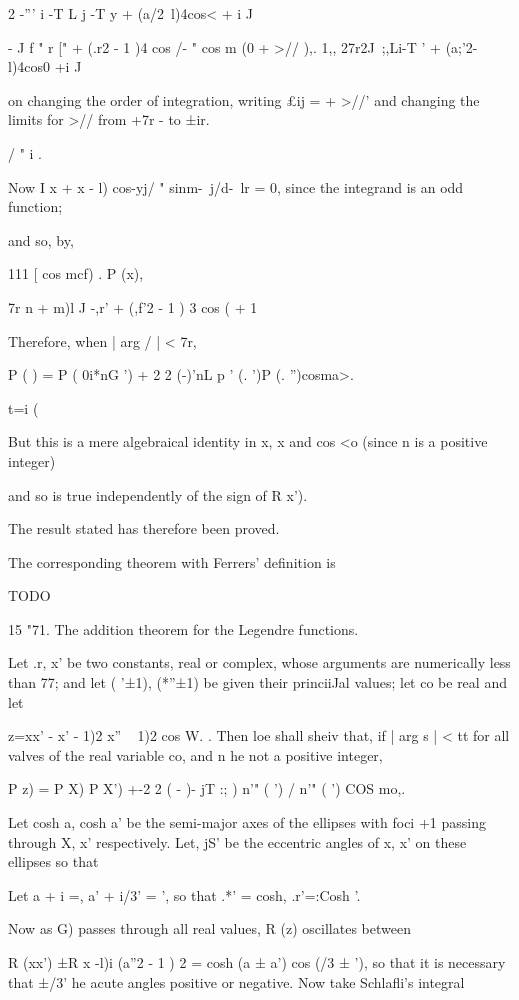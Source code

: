 {{{2 -''' i -T L j -T y + (a/2\ l)4cos< + i J

- J f " r [" + (.r2 - 1 )4 cos /- " cos m (0 + >// ),. 1,, 27r2J\
;,Li-T ' + (a;'2-l)4cos0 +i J

on changing the order of integration, writing £ij = + >//' and
changing the limits for >// from +7r - to ±ir.

%
%

/ " i .

Now I x + x - l) cos-yj/ " sinm-\ j/d-\ lr = 0, since the integrand is
an odd function;

and so, by,

111 [ cos mcf) . P (x),

7r n + m)l J -,r' + (,f'2 - 1 ) 3 cos ( + 1

Therefore, when | arg / | < 7r,

P ( ) = P ( 0i*nG ') + 2 2 (-)'nL p ' (. ')P (. '')cosma>.

 t=i (%

But this is a mere algebraical identity in x, x and cos <o (since n is
a positive integer)

and so is true independently of the sign of R x').

The result stated has therefore been proved.

The corresponding theorem with Ferrers' definition is

TODO

15 "71. The addition theorem for the Legendre functions.

Let .r, x' be two constants, real or complex, whose arguments are
numerically less than 77; and let ( '±1), (*''±1) be given their
princiiJal values; let co be real and let

z=xx' - x' - 1)2 x'' ~ 1)2 cos W. . Then loe shall sheiv that, if |
arg s | < tt for all valves of the real variable co, and n he not a
positive integer,

P z) = P X) P X') +-2 2 ( - )- jT :; ) n'" ( ') / n'" ( ') COS mo,.

Let cosh a, cosh a' be the semi-major axes of the ellipses with foci
+1 passing through X, x' respectively. Let, jS' be the eccentric
angles of x, x' on these ellipses so that

Let a + i =, a' + i/3' = ', so that .*' = cosh, .r'=:Cosh '.

Now as G) passes through all real values, R (z) oscillates between

R (xx') ±R x -l)i (a''2 - 1 ) 2 = cosh (a ± a') cos (/3 ± '), so that
it is necessary that ±/3' he acute angles positive or negative. Now
take Schlafli's integral

}}}
